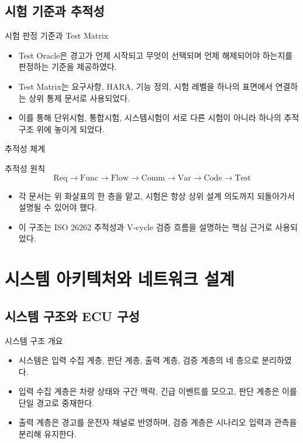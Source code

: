 \documentclass[aspectratio=169,10pt]{beamer}
\begin{document}
\subsection{시험 기준과 추적성}
\begin{frame}{시험 판정 기준과 Test Matrix}
\begin{itemize}
  \item Test Oracle은 경고가 언제 시작되고 무엇이 선택되며 언제 해제되어야 하는지를 판정하는 기준을 제공하였다.
  \item Test Matrix는 요구사항, HARA, 기능 정의, 시험 레벨을 하나의 표면에서 연결하는 상위 통제 문서로 사용되었다.
  \item 이를 통해 단위시험, 통합시험, 시스템시험이 서로 다른 시험이 아니라 하나의 추적 구조 위에 놓이게 되었다.
\end{itemize}
\end{frame}

\begin{frame}{추적성 체계}
\begin{block}{추적성 원칙}
\[
\text{Req} \rightarrow \text{Func} \rightarrow \text{Flow} \rightarrow \text{Comm} \rightarrow \text{Var} \rightarrow \text{Code} \rightarrow \text{Test}
\]
\end{block}
\begin{itemize}
  \item 각 문서는 위 화살표의 한 층을 맡고, 시험은 항상 상위 설계 의도까지 되돌아가서 설명될 수 있어야 했다.
  \item 이 구조는 ISO 26262 추적성과 V-cycle 검증 흐름을 설명하는 핵심 근거로 사용되었다.
\end{itemize}
\end{frame}

\section{시스템 아키텍처와 네트워크 설계}
\subsection{시스템 구조와 ECU 구성}

\begin{frame}{시스템 구조 개요}
\begin{itemize}
  \item 시스템은 입력 수집 계층, 판단 계층, 출력 계층, 검증 계층의 네 층으로 분리하였다.
  \item 입력 수집 계층은 차량 상태와 구간 맥락, 긴급 이벤트를 모으고, 판단 계층은 이를 단일 경고로 중재한다.
  \item 출력 계층은 경고를 운전자 채널로 반영하며, 검증 계층은 시나리오 입력과 관측을 분리해 유지한다.
\end{itemize}
\end{frame}
\end{document}
